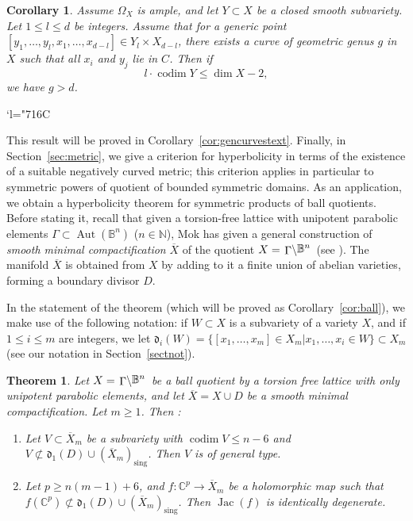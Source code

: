 \documentclass[JEP,XML,SOM,Unicode, NoEqCountersInSection,NoFloatCountersInSection,published]{cedram}
\newcommand{\Changelback}{\mathcode`l="716C}
\newenvironment{enumeratea}
{\bgroup\def\theenumi{\alph{enumi}}\begin{enumerate}}
{\end{enumerate}\egroup}
\newcommand{\sing}{\mathrm{sing}}
\DeclareMathOperator{\Aut}{Aut}
\DeclareMathOperator{\codim}{codim}
\DeclareMathOperator{\Jac}{Jac}
\theoremstyle{theorem}
\newtheorem{theorem}{Theorem}
\newtheorem{corollary}[proposition]{Corollary}
\theoremstyle{definition}
\newcommand{\quotient}[2]{{\left.\raisebox{-.08em}{$#1$}\middle\backslash\raisebox{.08em}{$#2$}\right.}}
\begin{document}
\begin{corollary} \label{corolgencurves}
Assume $\Omega_X$ is ample, and let $Y \subset X$ be a closed smooth subvariety. Let $1 \leq l \leq d$ be integers. Assume that for a generic point \([y_{1}, \dotsc, y_{l}, x_{1}, \dotsc, x_{d-l}] \in Y_{l} \times X_{d-l}\), there exists a curve of geometric genus \(g\) in \(X\) such that all \(x_{i}\) and \(y_{j}\) lie in \(C\).
Then if
\[
l \cdot \codim  Y \leq \dim X - 2,
\]
we have $g > d$.
\end{corollary}
\Changelback

This result will be proved in Corollary~\ref{cor:gencurvestext}. Finally, in Section~\ref{sec:metric}, we give a criterion for hyperbolicity in terms of the existence of a suitable negatively curved metric; this criterion applies in particular to symmetric powers of quotient of bounded symmetric domains. As an application, we obtain a hyperbolicity theorem for symmetric products of ball quotients. Before stating it, recall that given a torsion-free lattice with unipotent parabolic elements \(\Gamma \subset \Aut(\mathbb{B}^{n})\) (\(n \in \mathbb{N}\)), Mok has given a general construction of \emph{smooth minimal compactification} \(\overline{X}\) of the quotient \(X = \quotient{\Gamma}{\mathbb{B}^{n}}\) (see \cite{mok12}). The manifold \(\overline{X}\) is obtained from \(X\) by adding to it a finite union of abelian varieties, forming a boundary divisor \(D\).

In the statement of the theorem (which will be proved as Corollary~\ref{cor:ball}), we make use of the following notation: if \(W \subset X\) is a subvariety of a variety \(X\), and if \(1 \leq i \leq m\) are integers, we let
\(
\mathfrak{d}_{i} (W) = \{ [x_1,\dots, x_m] \in X_m | x_{1}, \dotsc, x_{i} \in W \} \subset X_{m}
\)
(see our notation in Section~\ref{sectnot}).

\begin{theorem} \label{thm:hypball} Let $X = \quotient{\Gamma}{\mathbb B^n}$ be a ball quotient by a torsion free lattice with only unipotent parabolic elements, and let $\overline{X} = X \cup D$ be a smooth minimal compactification. Let $m \geq 1$. Then :
\begin{enumeratea}
\item Let $V \subset \overline{X}_m$ be a subvariety with $\codim  V \leq n - 6$ and $V \not\subset \mathfrak{d}_1(D) \cup (\overline{X}_m)_{\sing}$. Then $V$ is of general type.

\item Let $p \geq n(m-1) + 6$, and $f : \mathbb C^p \to \overline{X}_m$ be a holomorphic map such that $f(\mathbb C^p) \not\subset \mathfrak{d}_1(D) \cup (\overline{X}_m)_{\sing}$. Then $\Jac(f)$ is identically degenerate.
\end{enumeratea}
\end{theorem}
\end{document}

